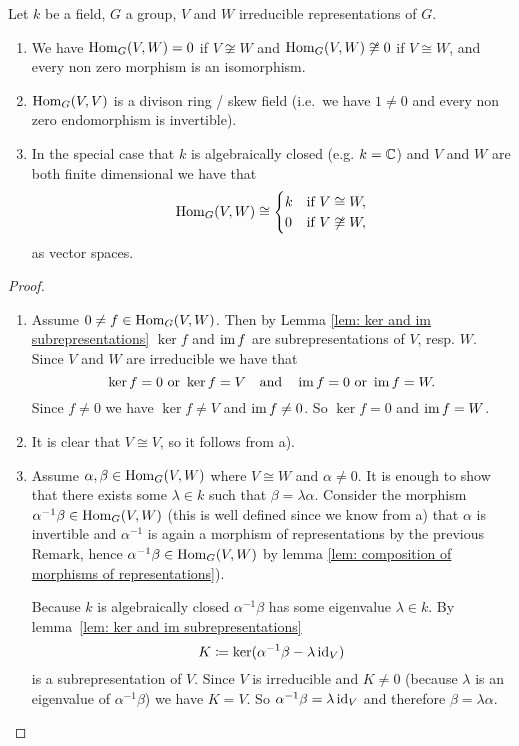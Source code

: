 \begin{lem}
  Let $k$ be a field, $G$ a group, $V$ and $W$ irreducible representations of $G$.
  \begin{enumerate}[label=\emph{\alph*)},leftmargin=*]
    \item
      We have $\operatorname{Hom}_G(V,W) = 0$ if $V \not\cong W$ and $\operatorname{Hom}_G(V,W) \not\cong 0$ if $V \cong W$, and every non zero morphism is an isomorphism.
    \item
      $\operatorname{Hom}_G(V,V)$ is a divison ring / skew field (i.e.\ we have $1 \neq 0$ and every non zero endomorphism is invertible).
    \item
      In the special case that $k$ is algebraically closed (e.g. $k = \mathbb{C}$) and $V$ and $W$ are both finite dimensional we have that
      \[
        \operatorname{Hom}_G(V,W) \cong
        \begin{cases}
          k & \text{if } V \cong W, \\
          0 & \text{if } V \not\cong W,
        \end{cases}
      \]
      as vector spaces.
  \end{enumerate}
\end{lem}
\begin{proof}
  \begin{enumerate}[label=\emph{\alph*)},leftmargin=*]
    \item 
      Assume $0 \neq f \in \operatorname{Hom}_G(V,W)$. Then by Lemma \ref{lem: ker and im subrepresentations} $\ker f$ and $\operatorname{im} f$ are subrepresentations of $V$, resp. $W$. Since $V$ and $W$ are irreducible we have that
      \[
        \ker f = 0 \text{ or } \ker f = V \quad \text{and} \quad \operatorname{im} f = 0 \text{ or } \operatorname{im} f = W.
      \]
      Since $f \neq 0$ we have $\ker f \neq V$ and $\operatorname{im} f \neq 0$. So $\ker f = 0$ and $\operatorname{im} f = W$.
    \item
      It is clear that $V \cong V$, so it follows from a).
    \item
      Assume $\alpha, \beta \in \operatorname{Hom}_G(V,W)$ where $V \cong W$ and $\alpha \neq 0$. It is enough to show that there exists some $\lambda \in k$ such that $\beta = \lambda \alpha$. Consider the morphism $\alpha^{-1} \beta \in \operatorname{Hom}_G(V,W)$ (this is well defined since we know from a) that $\alpha$ is invertible and $\alpha^{-1}$ is again a morphism of representations by the previous Remark, hence $\alpha^{-1} \beta \in \operatorname{Hom}_G(V,W)$ by lemma \ref{lem: composition of morphisms of representations}).
      
      Because $k$ is algebraically closed $\alpha^{-1} \beta$ has some eigenvalue $\lambda \in k$. By \mbox{lemma \ref{lem: ker and im subrepresentations}}
      \[
        K \coloneqq \ker(\alpha^{-1} \beta - \lambda \operatorname{id}_V)
      \]
      is a subrepresentation of $V$. Since $V$ is irreducible and $K \neq 0$ (because $\lambda$ is an eigenvalue of $\alpha^{-1} \beta$) we have $K = V$. So $\alpha^{-1} \beta = \lambda \operatorname{id}_V$ and therefore $\beta = \lambda \alpha$.
    \qedhere
  \end{enumerate}
\end{proof}


